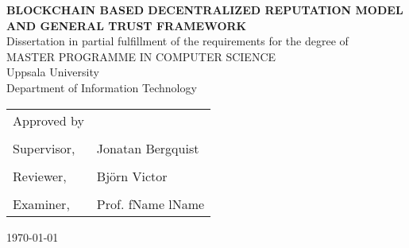 
\thispagestyle{empty}

\vspace*{+5em}
\begin{center}
\textbf{BLOCKCHAIN BASED DECENTRALIZED REPUTATION MODEL AND GENERAL TRUST FRAMEWORK}\\
\vspace*{+4em}
Dissertation in partial fulfillment of the requirements for the degree of\\
\vspace{+2em}
MASTER PROGRAMME IN COMPUTER SCIENCE\\

\vspace*{+3em}
Uppsala University\\
Department of Information Technology\\
\vspace*{+2em}

\end{center}

\begin{tabular}{ l l }
 Approved by &   \\
  & \\
  Supervisor, & Jonatan Bergquist \\ 
  & \\
  Reviewer, & Björn Victor \\
  & \\
 Examiner, & Prof. fName lName \\ 
\end{tabular}

\vspace*{+4em}

\begin{center}
\today
\end{center}

